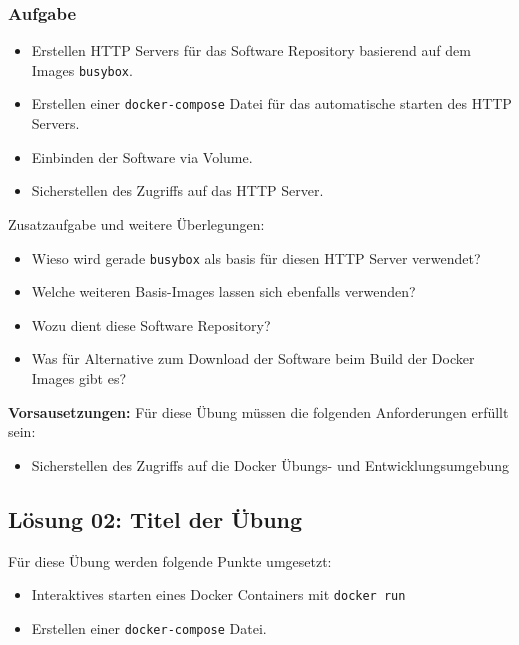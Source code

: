 \hypertarget{aufgabe-1}{%
\subsubsection{Aufgabe}\label{aufgabe-1}}

\begin{itemize}
\tightlist
\item
  Erstellen HTTP Servers für das Software Repository basierend auf dem
  Images \passthrough{\lstinline!busybox!}.
\item
  Erstellen einer \passthrough{\lstinline!docker-compose!} Datei für das
  automatische starten des HTTP Servers.
\item
  Einbinden der Software via Volume.
\item
  Sicherstellen des Zugriffs auf das HTTP Server.
\end{itemize}

Zusatzaufgabe und weitere Überlegungen:

\begin{itemize}
\tightlist
\item
  Wieso wird gerade \passthrough{\lstinline!busybox!} als basis für
  diesen HTTP Server verwendet?
\item
  Welche weiteren Basis-Images lassen sich ebenfalls verwenden?
\item
  Wozu dient diese Software Repository?
\item
  Was für Alternative zum Download der Software beim Build der Docker
  Images gibt es?
\end{itemize}

\textbf{Vorsausetzungen:} Für diese Übung müssen die folgenden
Anforderungen erfüllt sein:

\begin{itemize}
\tightlist
\item
  Sicherstellen des Zugriffs auf die Docker Übungs- und
  Entwicklungsumgebung
\end{itemize}

\hypertarget{luxf6sung-02-titel-der-uxfcbung}{%
\subsection{Lösung 02: Titel der
Übung}\label{luxf6sung-02-titel-der-uxfcbung}}

Für diese Übung werden folgende Punkte umgesetzt:

\begin{itemize}
\tightlist
\item
  Interaktives starten eines Docker Containers mit
  \passthrough{\lstinline!docker run!}
\item
  Erstellen einer \passthrough{\lstinline!docker-compose!} Datei.
\end{itemize}

